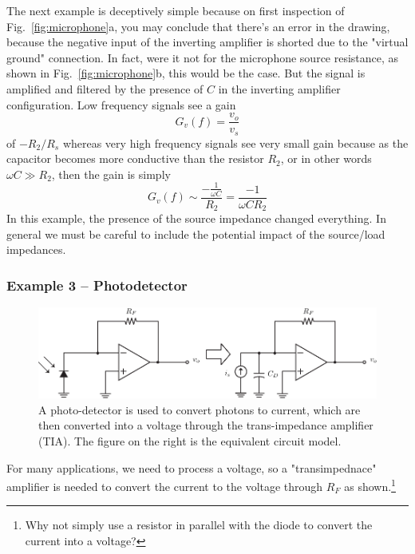 The next example is deceptively simple because on first inspection of Fig.~\ref{fig:microphone}a, you may conclude that there's an error in the drawing, because the negative input of the inverting amplifier is shorted due to the "virtual ground" connection.  In fact, were it not for the microphone source resistance, as shown in  Fig.~\ref{fig:microphone}b, this would be the case. But the signal is amplified and filtered by the presence of $C$ in the inverting amplifier configuration.  Low frequency signals see a gain 
\begin{equation}
     G_v(f) = \frac{v_{o}}{v_s }
\end{equation}
of $-R_2/R_s$ whereas very high frequency signals see very small gain because as the capacitor becomes more conductive than the resistor $R_2$, or in other words $\omega C \gg R_2$, then the gain is simply
\begin{equation}
	G_v(f) \sim \frac{-\frac{1}{\omega C}}{R_2 } = \frac{-1}{\omega C R_2 }
\end{equation}
In this example, the presence of the source impedance changed everything.  In general we must be careful to include the potential impact of the source/load impedances.  




\subsubsection{Example 3 – Photodetector}

\begin{figure}[tb]
\begin{center}
\includegraphics[width=.8\columnwidth]{ex_photodetect}
\end{center}
\caption{A photo-detector is used to convert photons to current, which are then converted into a voltage through the trans-impedance amplifier (TIA).  The figure on the right is the equivalent circuit model.} \label{fig:pd_detect}
\end{figure}


For many applications, we need to process a voltage, so a "transimpednace" amplifier is needed to convert the current to the voltage through $R_F$ as shown.\footnote{Why not simply use a resistor in parallel with the diode to convert the current into a voltage?}

